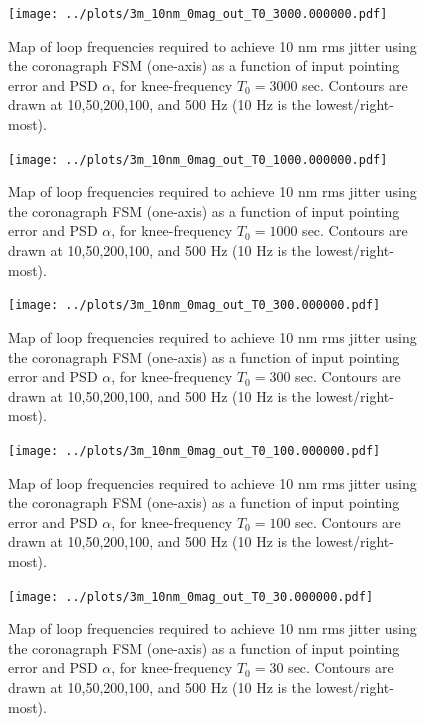\documentclass[10pt,preprint]{aastex631}
\begin{document}
\begin{figure}[h!]
\centering
\texttt{[image: ../plots/3m\_10nm\_0mag\_out\_T0\_3000.000000.pdf]}
\caption{Map of loop frequencies required to achieve 10 nm rms jitter using the coronagraph FSM (one-axis) as a function of input pointing error and PSD $\alpha$, for knee-frequency $T_0 = 3000$ sec.  Contours are drawn at 10,50,200,100, and 500 Hz (10 Hz is the lowest/right-most).  \label{fig:s1_T0-3000}}
\end{figure}

\begin{figure}[h!]
\centering
\texttt{[image: ../plots/3m\_10nm\_0mag\_out\_T0\_1000.000000.pdf]}
\caption{Map of loop frequencies required to achieve 10 nm rms jitter using the coronagraph FSM (one-axis) as a function of input pointing error and PSD $\alpha$, for knee-frequency $T_0 = 1000$ sec.  Contours are drawn at 10,50,200,100, and 500 Hz (10 Hz is the lowest/right-most).  \label{fig:s1_T0-1000}}
\end{figure}

\begin{figure}[h!]
\centering
\texttt{[image: ../plots/3m\_10nm\_0mag\_out\_T0\_300.000000.pdf]}
\caption{Map of loop frequencies required to achieve 10 nm rms jitter using the coronagraph FSM (one-axis) as a function of input pointing error and PSD $\alpha$, for knee-frequency $T_0 = 300$ sec.  Contours are drawn at 10,50,200,100, and 500 Hz (10 Hz is the lowest/right-most).  \label{fig:s1_T0-300}}
\end{figure}

\begin{figure}[h!]
\centering
\texttt{[image: ../plots/3m\_10nm\_0mag\_out\_T0\_100.000000.pdf]}
\caption{Map of loop frequencies required to achieve 10 nm rms jitter using the coronagraph FSM (one-axis) as a function of input pointing error and PSD $\alpha$, for knee-frequency $T_0 = 100$ sec.  Contours are drawn at 10,50,200,100, and 500 Hz (10 Hz is the lowest/right-most).  \label{fig:s1_T0-100}}
\end{figure}

\begin{figure}[h!]
\centering
\texttt{[image: ../plots/3m\_10nm\_0mag\_out\_T0\_30.000000.pdf]}
\caption{Map of loop frequencies required to achieve 10 nm rms jitter using the coronagraph FSM (one-axis) as a function of input pointing error and PSD $\alpha$, for knee-frequency $T_0 = 30$ sec.  Contours are drawn at 10,50,200,100, and 500 Hz (10 Hz is the lowest/right-most).  \label{fig:s1_T0-30}}
\end{figure}
\end{document}
